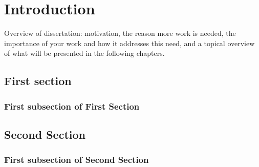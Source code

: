 \chapter{Introduction}\label{chap:intro}

Overview of dissertation: motivation, the reason more work is needed, the importance of your work and how it addresses this need, and a topical overview of what will be presented in the following chapters.

\section{First section}
\subsection{First subsection of First Section}
\section{Second Section}
\subsection{First subsection of Second Section}
\endinput 